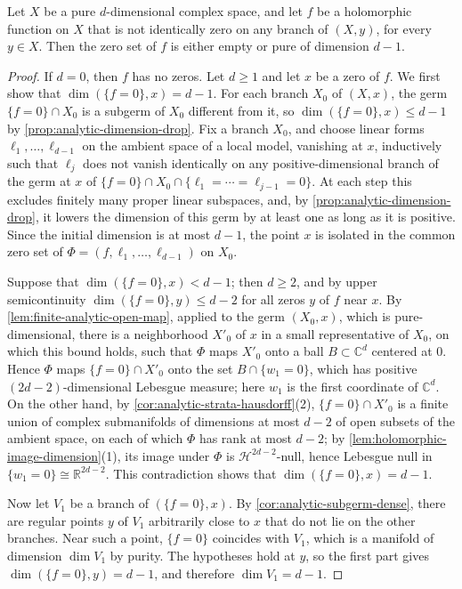 \begin{proposition}\label{prop:analytic-hypersurface-dimension}
Let $X$ be a pure $d$-dimensional complex space, and let $f$ be a holomorphic function on $X$ that is not identically zero on any branch of $(X,y)$, for every $y\in X$. Then the zero set of $f$ is either empty or pure of dimension $d-1$.
\end{proposition}
\begin{proof}
If $d=0$, then $f$ has no zeros. Let $d\geq1$ and let $x$ be a zero of $f$. We first show that $\dim(\{f=0\},x)=d-1$. For each branch $X_0$ of $(X,x)$, the germ $\{f=0\}\cap X_0$ is a subgerm of $X_0$ different from it, so $\dim(\{f=0\},x)\leq d-1$ by \cref{prop:analytic-dimension-drop}. Fix a branch $X_0$, and choose linear forms $\ell_1,\ldots,\ell_{d-1}$ on the ambient space of a local model, vanishing at $x$, inductively such that $\ell_j$ does not vanish identically on any positive-dimensional branch of the germ at $x$ of $\{f=0\}\cap X_0\cap\{\ell_1=\cdots=\ell_{j-1}=0\}$. At each step this excludes finitely many proper linear subspaces, and, by \cref{prop:analytic-dimension-drop}, it lowers the dimension of this germ by at least one as long as it is positive. Since the initial dimension is at most $d-1$, the point $x$ is isolated in the common zero set of $\Phi=(f,\ell_1,\ldots,\ell_{d-1})$ on $X_0$.

Suppose that $\dim(\{f=0\},x)<d-1$; then $d\geq2$, and by upper semicontinuity $\dim(\{f=0\},y)\leq d-2$ for all zeros $y$ of $f$ near $x$. By \cref{lem:finite-analytic-open-map}, applied to the germ $(X_0,x)$, which is pure-dimensional, there is a neighborhood $X'_0$ of $x$ in a small representative of $X_0$, on which this bound holds, such that $\Phi$ maps $X'_0$ onto a ball $B\subset\mathbb C^d$ centered at $0$. Hence $\Phi$ maps $\{f=0\}\cap X'_0$ onto the set $B\cap\{w_1=0\}$, which has positive $(2d-2)$-dimensional Lebesgue measure; here $w_1$ is the first coordinate of $\mathbb C^d$. On the other hand, by \cref{cor:analytic-strata-hausdorff}(2), $\{f=0\}\cap X'_0$ is a finite union of complex submanifolds of dimensions at most $d-2$ of open subsets of the ambient space, on each of which $\Phi$ has rank at most $d-2$; by \cref{lem:holomorphic-image-dimension}(1), its image under $\Phi$ is $\mathcal H^{2d-2}$-null, hence Lebesgue null in $\{w_1=0\}\cong\mathbb R^{2d-2}$. This contradiction shows that $\dim(\{f=0\},x)=d-1$.

Now let $V_1$ be a branch of $(\{f=0\},x)$. By \cref{cor:analytic-subgerm-dense}, there are regular points $y$ of $V_1$ arbitrarily close to $x$ that do not lie on the other branches. Near such a point, $\{f=0\}$ coincides with $V_1$, which is a manifold of dimension $\dim V_1$ by purity. The hypotheses hold at $y$, so the first part gives $\dim(\{f=0\},y)=d-1$, and therefore $\dim V_1=d-1$.
\end{proof}

